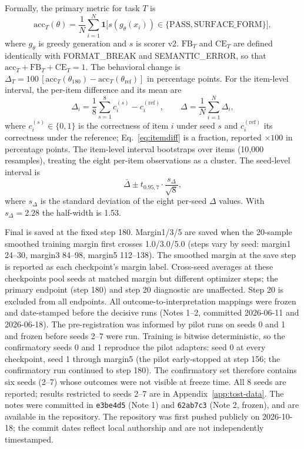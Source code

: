 \documentclass{article}
\begin{document}
Formally, the primary metric for task $T$ is
\begin{equation}
\text{acc}_T(\theta) = \frac{1}{N} \sum_{i=1}^{N} \mathbf{1}\big[s(g_\theta(x_i)) \in \{\text{PASS}, \text{SURFACE\_FORM}\}\big],
\label{eq:acc}
\end{equation}
where $g_\theta$ is greedy generation and $s$ is scorer v2. $\text{FB}_T$ and $\text{CE}_T$ are defined identically with FORMAT\_BREAK and SEMANTIC\_ERROR, so that $\text{acc}_T + \text{FB}_T + \text{CE}_T = 1$. The behavioral change is $\Delta_T = 100\,[\text{acc}_T(\theta_{180}) - \text{acc}_T(\theta_{\text{ref}})]$ in percentage points. For the item-level interval, the per-item difference and its mean are
\begin{equation}
\Delta_i = \frac{1}{8} \sum_{s=1}^{8} c_i^{(s)} - c_i^{(\text{ref})}, \qquad \Delta = \frac{1}{N} \sum_{i=1}^{N} \Delta_i,
\label{eq:itemdiff}
\end{equation}
where $c_i^{(s)} \in \{0, 1\}$ is the correctness of item $i$ under seed $s$ and $c_i^{(\text{ref})}$ its correctness under the reference; Eq.~\eqref{eq:itemdiff} is a fraction, reported $\times 100$ in percentage points. The item-level interval bootstraps over items (10{,}000 resamples), treating the eight per-item observations as a cluster. The seed-level interval is
\begin{equation}
\bar{\Delta} \pm t_{0.95, 7} \cdot \frac{s_\Delta}{\sqrt{8}},
\label{eq:seedci}
\end{equation}
where $s_\Delta$ is the standard deviation of the eight per-seed $\Delta$ values. With $s_\Delta = 2.28$ the half-width is 1.53.

Final is saved at the fixed step 180. Margin1/3/5 are saved when the 20-sample smoothed training margin first crosses 1.0/3.0/5.0 (steps vary by seed: margin1 24--30, margin3 84--98, margin5 112--138). The smoothed margin at the save step is reported as each checkpoint's margin label. Cross-seed averages at these checkpoints pool seeds at matched margin but different optimizer steps; the primary endpoint (step 180) and step 20 diagnostic are unaffected. Step 20 is excluded from all endpoints. All outcome-to-interpretation mappings were frozen and date-stamped before the decisive runs (Notes 1--2, committed 2026-06-11 and 2026-06-18). The pre-registration was informed by pilot runs on seeds 0 and 1 and frozen before seeds 2--7 were run. Training is bitwise deterministic, so the confirmatory seeds 0 and 1 reproduce the pilot adapters: seed 0 at every checkpoint, seed 1 through margin5 (the pilot early-stopped at step 156; the confirmatory run continued to step 180). The confirmatory set therefore contains six seeds (2--7) whose outcomes were not visible at freeze time. All 8 seeds are reported; results restricted to seeds 2--7 are in Appendix~\ref{app:tost-data}. The notes were committed in \texttt{e3be4d5} (Note 1) and \texttt{62ab7c3} (Note 2, frozen), and are available in the repository. The repository was first pushed publicly on 2026-10-18; the commit dates reflect local authorship and are not independently timestamped.
\end{document}
